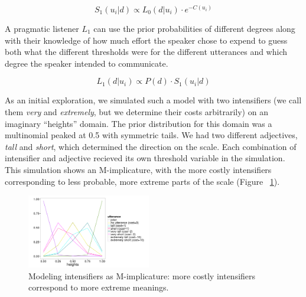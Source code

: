 \documentclass[10pt,letterpaper]{article}
\newcommand{\w}[1]{\emph{#1}}
\begin{document}
\[ S_1(u_i | d) \propto L_0(d | u_i) \cdot e^{-C(u_i)} \]

A pragmatic listener $L_1$ can use the prior probabilities of different degrees along with their knowledge of how much effort the speaker chose to expend to guess both what the different thresholds were for the different utterances and which degree the speaker intended to communicate.

\[ L_1(d | u_i) \propto P(d) \cdot S_1(u_i | d) \]

As an initial exploration, we simulated such a model with two intensifiers (we call them \w{very} and \w{extremely}, but we determine their costs arbitrarily) on an imaginary ``heights'' domain. The prior distribution for this domain was a multinomial peaked at 0.5 with symmetric tails. We had two different adjectives, \w{tall} and \w{short}, which determined the direction on the scale. Each combination of intensifier and adjective recieved its own threshold variable in the simulation. This simulation shows an M-implicature, with the more costly intensifiers corresponding to less probable, more extreme parts of the scale (Figure ~\ref{model}).


\begin{figure}[ht]
\begin{center}
\includegraphics[width=0.48\textwidth]{analysis_files_for_writeup/images/model_results.png}
\end{center}
\caption{Modeling intensifiers as M-implicature: more costly intensifiers correspond to more extreme meanings.} 
\label{model}
\end{figure}
\end{document}
